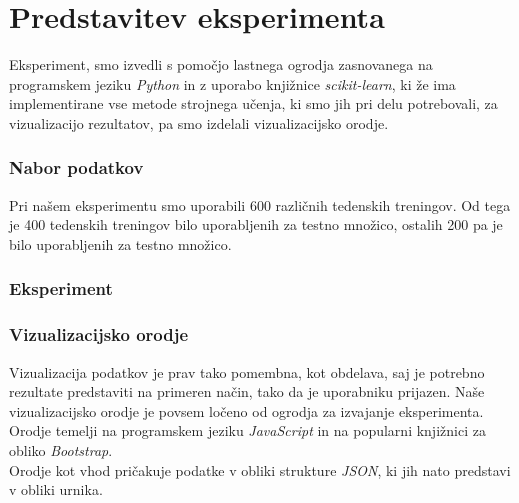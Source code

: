 \documentclass{acm_proc_article-sp}
\begin{document}
\section{Predstavitev eksperimenta}
Eksperiment, smo izvedli s pomočjo lastnega ogrodja zasnovanega na programskem jeziku \textit{Python} in z uporabo knjižnice \textit{scikit-learn}, ki že ima implementirane vse metode strojnega učenja, ki smo jih pri delu potrebovali, za vizualizacijo rezultatov, pa smo izdelali vizualizacijsko orodje. 


\subsubsection{Nabor podatkov}
Pri našem eksperimentu smo uporabili 600 različnih tedenskih treningov.
Od tega je 400 tedenskih treningov bilo uporabljenih za testno množico, ostalih 200 pa je bilo uporabljenih za testno množico.

\subsubsection{Eksperiment}

\subsubsection{Vizualizacijsko orodje}
Vizualizacija podatkov je prav tako pomembna, kot obdelava, saj je potrebno rezultate predstaviti na primeren način, tako da je uporabniku prijazen. Naše vizualizacijsko orodje je povsem ločeno od ogrodja za izvajanje eksperimenta. Orodje temelji na programskem jeziku \textit{JavaScript} in na popularni knjižnici za obliko \textit{Bootstrap}.\\
Orodje kot vhod pričakuje podatke v obliki strukture \textit{JSON}, ki jih nato predstavi v obliki urnika.\\ 
\end{document}
